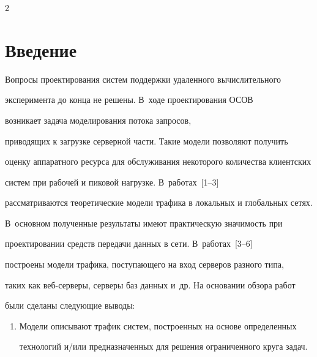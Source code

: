   




   




      \thispagestyle{headings}



      \begin{multicols}{2}



            \label{st\stat}

  

\section{Введение}

  

  Вопросы проектирования систем поддержки удаленного вычислительного 

эксперимента до \mbox{конца} не решены. В~ходе проектирования ОСОВ 

возникает задача моделирования потока запросов, 

приводящих к загрузке серверной части. Такие модели позволяют получить 

оценку аппаратного ресурса для обслуживания некоторого количества клиентских 

систем при рабочей и пиковой нагрузке. В~работах~[1--3] 

рассматриваются теоретические модели трафика в локальных и глобальных сетях. 

В~основном полученные результаты имеют практическую значимость при 

проектировании средств передачи данных в сети. В~работах~[3--6] 

построены модели трафика, поступающего на вход серверов разного типа, 

таких как веб-серверы, серверы баз данных и~др. На основании обзора работ 

были сделаны следующие выводы:

\begin{enumerate}[1.]

\item Модели описывают трафик систем, построенных на основе определенных 

технологий и/или предназначенных для решения ограниченного круга задач.


\end{enumerate}
\end{multicols}
